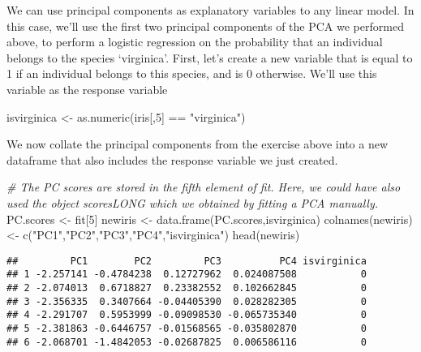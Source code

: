 \documentclass[
]{book}
\newenvironment{Shaded}{\begin{snugshade}}{\end{snugshade}}
\newcommand{\CommentTok}[1]{\textcolor[rgb]{0.56,0.35,0.01}{\textit{#1}}}
\newcommand{\DecValTok}[1]{\textcolor[rgb]{0.00,0.00,0.81}{#1}}
\newcommand{\FunctionTok}[1]{\textcolor[rgb]{0.00,0.00,0.00}{#1}}
\newcommand{\NormalTok}[1]{#1}
\newcommand{\OtherTok}[1]{\textcolor[rgb]{0.56,0.35,0.01}{#1}}
\newcommand{\SpecialCharTok}[1]{\textcolor[rgb]{0.00,0.00,0.00}{#1}}
\newcommand{\StringTok}[1]{\textcolor[rgb]{0.31,0.60,0.02}{#1}}
\begin{document}
We can use principal components as explanatory variables to any linear model. In this case, we'll use the first two principal components of the PCA we performed above, to perform a logistic regression on the probability that an individual belongs to the species `virginica'. First, let's create a new variable that is equal to 1 if an individual belongs to this species, and is 0 otherwise. We'll use this variable as the response variable

\begin{Shaded}
\begin{Highlighting}[]
\NormalTok{isvirginica }\OtherTok{\textless{}{-}}  \FunctionTok{as.numeric}\NormalTok{(iris[,}\DecValTok{5}\NormalTok{] }\SpecialCharTok{==} \StringTok{"virginica"}\NormalTok{)}
\end{Highlighting}
\end{Shaded}

We now collate the principal components from the exercise above into a new dataframe that also includes the response variable we just created.

\begin{Shaded}
\begin{Highlighting}[]
\CommentTok{\# The PC scores are stored in the fifth element of fit. Here, we could have also used the object scoresLONG which we obtained by fitting a PCA manually.}
\NormalTok{PC.scores }\OtherTok{\textless{}{-}}\NormalTok{ fit[}\DecValTok{5}\NormalTok{] }
\NormalTok{newiris }\OtherTok{\textless{}{-}} \FunctionTok{data.frame}\NormalTok{(PC.scores,isvirginica)}
\FunctionTok{colnames}\NormalTok{(newiris) }\OtherTok{\textless{}{-}} \FunctionTok{c}\NormalTok{(}\StringTok{"PC1"}\NormalTok{,}\StringTok{"PC2"}\NormalTok{,}\StringTok{"PC3"}\NormalTok{,}\StringTok{"PC4"}\NormalTok{,}\StringTok{"isvirginica"}\NormalTok{)}
\FunctionTok{head}\NormalTok{(newiris)}
\end{Highlighting}
\end{Shaded}

\begin{verbatim}
##         PC1        PC2         PC3          PC4 isvirginica
## 1 -2.257141 -0.4784238  0.12727962  0.024087508           0
## 2 -2.074013  0.6718827  0.23382552  0.102662845           0
## 3 -2.356335  0.3407664 -0.04405390  0.028282305           0
## 4 -2.291707  0.5953999 -0.09098530 -0.065735340           0
## 5 -2.381863 -0.6446757 -0.01568565 -0.035802870           0
## 6 -2.068701 -1.4842053 -0.02687825  0.006586116           0
\end{verbatim}
\end{document}
